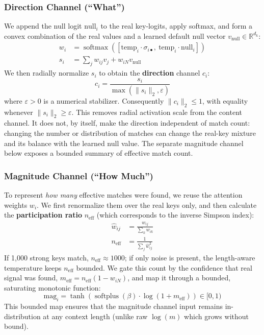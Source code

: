 \documentclass{article} %
\begin{document}
\subsubsection{Direction Channel (``What'')}
We append the null logit $\mathrm{null}_i$ to the real key-logits, apply softmax, and form a convex combination of the real values and a learned default null vector $v_{\text{null}} \in \mathbb{R}^{d_k}$:
\begin{align}
    w_i &= \operatorname{softmax}\left( \left[ \mathrm{temp}_i \cdot \sigma_{i\bullet}, \ \mathrm{temp}_i \cdot \mathrm{null}_i \right] \right) \\
    s_i &= \sum_{j} w_{ij} v_j + w_{iN} v_{\text{null}}
\end{align}
We then radially normalize $s_i$ to obtain the \textbf{direction} channel $c_i$:
\begin{equation}
    c_i = \frac{s_i}{\max(\|s_i\|_2,\varepsilon)}
\end{equation}
where $\varepsilon>0$ is a numerical stabilizer. Consequently $\|c_i\|_2\le 1$, with equality whenever $\|s_i\|_2\ge\varepsilon$. This removes radial activation scale from the content channel. It does not, by itself, make the direction independent of match count: changing the number or distribution of matches can change the real-key mixture and its balance with the learned null value. The separate magnitude channel below exposes a bounded summary of effective match count.

\subsubsection{Magnitude Channel (``How Much'')}
To represent \textit{how many} effective matches were found, we reuse the attention weights $w_i$. We first renormalize them over the real keys only, and then calculate the \textbf{participation ratio} $n_{\text{eff}}$ (which corresponds to the inverse Simpson index):
\begin{align}
    \hat{w}_{ij} &= \frac{w_{ij}}{\sum_k w_{ik}} \\
    n_{\text{eff}} &= \frac{1}{\sum_j \hat{w}_{ij}^2}
\end{align}
If 1,000 strong keys match, $n_{\text{eff}} \approx 1000$; if only noise is present, the length-aware temperature keeps $n_{\text{eff}}$ bounded. We gate this count by the confidence that real signal was found, $m_{\text{eff}} = n_{\text{eff}}(1 - w_{iN})$, and map it through a bounded, saturating monotonic function:
\begin{equation}
    \mathrm{mag}_i = \tanh\left( \operatorname{softplus}(\beta) \cdot \log(1 + m_{\text{eff}}) \right) \in [0, 1)
\end{equation}
This bounded map ensures that the magnitude channel input remains in-distribution at any context length (unlike raw $\log(m)$ which grows without bound).
\end{document}
